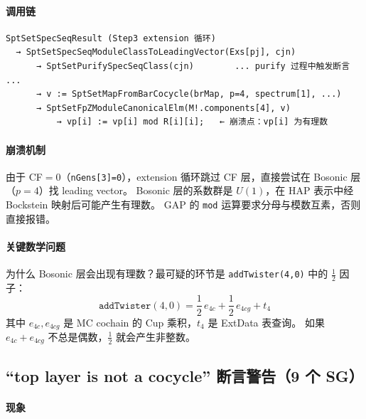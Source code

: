 \documentclass[a4paper,fontset=ubuntu,12pt]{ctexart}
\begin{document}
\paragraph{调用链}

\begin{verbatim}
SptSetSpecSeqResult (Step3 extension 循环)
  → SptSetSpecSeqModuleClassToLeadingVector(Exs[pj], cjn)
      → SptSetPurifySpecSeqClass(cjn)        ... purify 过程中触发断言 ...
      → v := SptSetMapFromBarCocycle(brMap, p=4, spectrum[1], ...)
      → SptSetFpZModuleCanonicalElm(M!.components[4], v)
          → vp[i] := vp[i] mod R[i][i];   ← 崩溃点：vp[i] 为有理数
\end{verbatim}

\paragraph{崩溃机制}

由于 CF$=0$（\texttt{nGens[3]=0}），extension 循环跳过 CF 层，直接尝试在 Bosonic 层（$p=4$）找 leading vector。
Bosonic 层的系数群是 $U(1)$，在 HAP 表示中经 Bockstein 映射后可能产生有理数。
GAP 的 \texttt{mod} 运算要求分母与模数互素，否则直接报错。

\paragraph{关键数学问题}

为什么 Bosonic 层会出现有理数？最可疑的环节是 \texttt{addTwister(4,0)} 中的 $\frac{1}{2}$ 因子：
\begin{equation}
\texttt{addTwister}(4,0) = \frac{1}{2}\,e_{4c} + \frac{1}{2}\,e_{4cg} + t_4
\label{eq:addtwister40}
\end{equation}
其中 $e_{4c}, e_{4cg}$ 是 MC cochain 的 Cup 乘积，$t_4$ 是 ExtData 表查询。
如果 $e_{4c} + e_{4cg}$ 不总是偶数，$\frac{1}{2}$ 就会产生非整数。

\subsection{``top layer is not a cocycle'' 断言警告（9 个 SG）}
\label{sec:assertion-warning}

\paragraph{现象}
\end{document}
